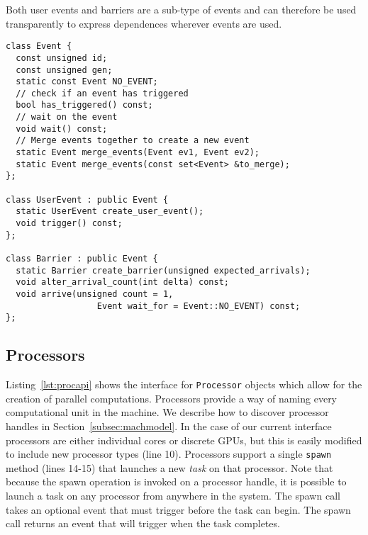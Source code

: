 Both user events and barriers are a sub-type of events and can therefore
be used transparently to express dependences wherever events are used.


\begin{lstlisting}[float={t},label={lst:eventapi},caption={Event Interface.}]
class Event {
  const unsigned id;
  const unsigned gen;
  static const Event NO_EVENT;
  // check if an event has triggered
  bool has_triggered() const;
  // wait on the event
  void wait() const;
  // Merge events together to create a new event
  static Event merge_events(Event ev1, Event ev2);
  static Event merge_events(const set<Event> &to_merge);
};

class UserEvent : public Event {
  static UserEvent create_user_event();
  void trigger() const;
};

class Barrier : public Event {
  static Barrier create_barrier(unsigned expected_arrivals);
  void alter_arrival_count(int delta) const;
  void arrive(unsigned count = 1,
                  Event wait_for = Event::NO_EVENT) const;
};
\end{lstlisting}

\subsection{Processors}
\label{subsec:procs}
Listing~\ref{lst:procapi} shows the interface for {\tt Processor} objects which allow for
the creation of parallel computations.  Processors provide a way of naming 
every computational unit in the machine.  We describe how to discover processor handles
in Section~\ref{subsec:machmodel}.  In the case of our current interface 
processors are either individual cores or discrete GPUs, but this is easily modified 
to include new processor types (line 10).   Processors support a single {\tt spawn}
method (lines 14-15) that launches a new {\em task} on that processor.
Note that because the spawn operation
is invoked on a processor handle, it is possible to launch a task on any
processor from anywhere in the system.  
The spawn call takes an optional event that must trigger before the task can begin.  
The spawn call returns an event that will trigger when the task completes.

